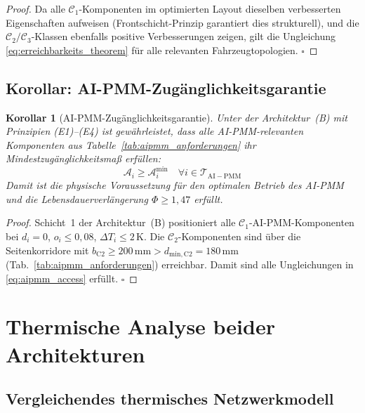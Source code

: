﻿\documentclass[12pt,a4paper]{article}
\newtheorem{corollary}[theorem]{Korollar}
\begin{document}
\begin{proof}
Da alle $\mathcal{C}_1$-Komponenten im optimierten Layout dieselben verbesserten
Eigenschaften aufweisen (Frontschicht-Prinzip garantiert dies strukturell), und die
$\mathcal{C}_2/\mathcal{C}_3$-Klassen ebenfalls positive Verbesserungen zeigen,
gilt die Ungleichung \eqref{eq:erreichbarkeits_theorem} für alle relevanten
Fahrzeugtopologien. \hfill$\square$
\end{proof}

\subsection{Korollar: AI-PMM-Zugänglichkeitsgarantie}

\begin{corollary}[AI-PMM-Zugänglichkeitsgarantie]
	\label{cor:aipmm_access}
	Unter der Architektur~(B) mit Prinzipien (E1)--(E4) ist gewährleistet, dass
	alle AI-PMM-relevanten Komponenten aus Tabelle~\ref{tab:aipmm_anforderungen}
	ihr Mindestzugänglichkeitsmaß erfüllen:
	\begin{equation}
		\mathcal{A}_i \geq \mathcal{A}_i^\mathrm{min} \quad
		\forall i \in \mathcal{T}_\mathrm{AI-PMM}
		\label{eq:aipmm_access}
	\end{equation}
	Damit ist die physische Voraussetzung für den optimalen Betrieb des AI-PMM
	und die Lebensdauerverlängerung $\Phi \geq 1{,}47$ \cite{Epp2026liion} erfüllt.
\end{corollary}

\begin{proof}
	Schicht~1 der Architektur~(B) positioniert alle $\mathcal{C}_1$-AI-PMM-Komponenten
	bei $d_i = 0$, $o_i \leq 0{,}08$, $\Delta T_i \leq 2\,\mathrm{K}$.
	Die $\mathcal{C}_2$-Komponenten sind über die Seitenkorridore mit $b_\mathrm{C2} \geq
	200\,\mathrm{mm} > d_\mathrm{min,C2} = 180\,\mathrm{mm}$ (Tab.~\ref{tab:aipmm_anforderungen})
	erreichbar. Damit sind alle Ungleichungen in \eqref{eq:aipmm_access} erfüllt.
	\hfill$\square$
\end{proof}

\section{Thermische Analyse beider Architekturen}
\label{sec:thermik}

\subsection{Vergleichendes thermisches Netzwerkmodell}
\end{document}
